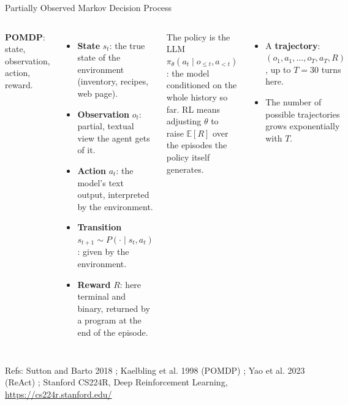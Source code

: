 \documentclass[aspectratio=169,10pt]{beamer}
\newcommand{\refs}[1]{\vfill{\tiny\textcolor{crMid}{Refs: #1}}}
\begin{document}
\begin{frame}{Partially Observed Markov Decision Process}
\begin{columns}[T]
\small
\textbf{POMDP}: state, observation, action, reward.
\begin{itemize}
  \item \textbf{State} $s_t$: the true state of the environment (inventory, recipes, web page).
  \item \textbf{Observation} $o_t$: partial, textual view the agent gets of it.
  \item \textbf{Action} $a_t$: the model's text output, interpreted by the environment.
  \item \textbf{Transition} $s_{t+1} \sim P(\cdot \mid s_t, a_t)$: given by the environment.
  \item \textbf{Reward} $R$: here terminal and binary, returned by a program at the end of the episode.
\end{itemize}
\small
\begin{block}{The policy is the LLM}
$\pi_\theta(a_t \mid o_{\le t}, a_{<t})$: the model conditioned on the whole history so far. RL means adjusting $\theta$ to raise $\mathbb{E}[R]$ over the episodes the policy itself generates.
\end{block}
\vspace{0.2cm}
\begin{itemize}
  \item A \textbf{trajectory}: $(o_1, a_1, \dots, o_T, a_T, R)$, up to $T = 30$ turns here.
  \item The number of possible trajectories grows exponentially with $T$.
\end{itemize}
\end{columns}
\refs{Sutton and Barto 2018 ; Kaelbling et al. 1998 (POMDP) ; Yao et al. 2023 (ReAct) ; Stanford CS224R, Deep Reinforcement Learning, \url{https://cs224r.stanford.edu/}}
\end{frame}
\end{document}

